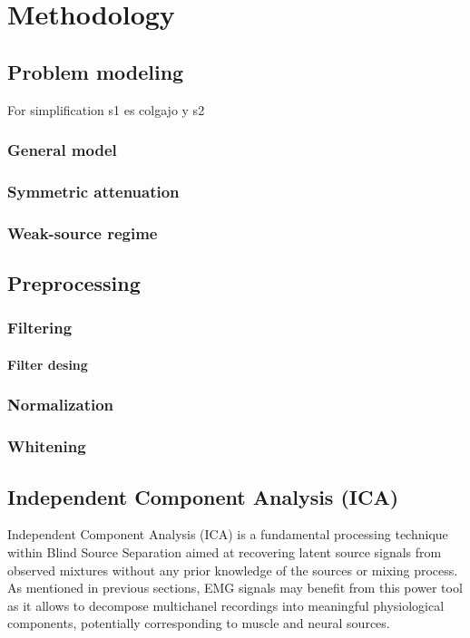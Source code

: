 \chapter{Methodology}

\section{Problem modeling}
For simplification s1 es colgajo y s2

\subsection{General model}
\subsection{Symmetric attenuation}
\label{subsec:Assymetric attenuation}
\subsection{Weak-source regime}
\clearpage
\section{Preprocessing}
\subsection{Filtering}
\subsubsection{Filter desing}
\subsection{Normalization}
\subsection{Whitening}
\section{Independent Component Analysis (ICA)}

Independent Component Analysis (ICA) is a fundamental processing technique within Blind Source Separation aimed at recovering latent source signals from observed mixtures without any prior knowledge of the sources or mixing process. As mentioned in previous sections, EMG signals may benefit from this power tool as it allows to decompose multichanel recordings into meaningful physiological components, potentially corresponding to muscle and neural sources.

